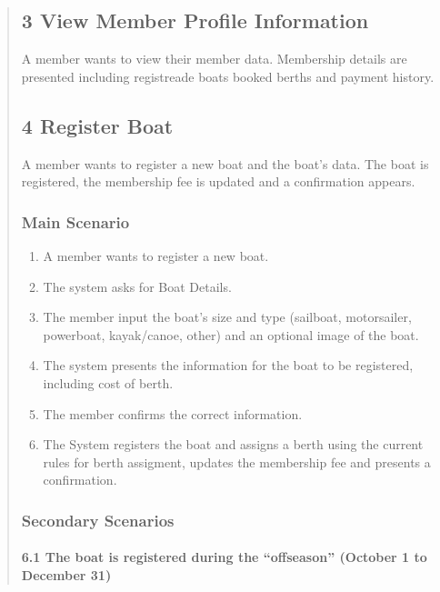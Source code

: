 \begin{quote}
\subsection{3 View Member Profile
Information}\label{view-member-profile-information}

A member wants to view their member data. Membership details are
presented including registreade boats booked berths and payment history.

\subsection{4 Register Boat}\label{register-boat}

A member wants to register a new boat and the boat's data. The boat is
registered, the membership fee is updated and a confirmation appears.

\subsubsection{Main Scenario}\label{main-scenario-2}

\begin{enumerate}
\tightlist
\item
  A member wants to register a new boat.
\item
  The system asks for Boat Details.
\item
  The member input the boat's size and type (sailboat, motorsailer,
  powerboat, kayak/canoe, other) and an optional image of the boat.
\item
  The system presents the information for the boat to be registered,
  including cost of berth.
\item
  The member confirms the correct information.
\item
  The System registers the boat and assigns a berth using the current
  rules for berth assigment, updates the membership fee and presents a
  confirmation.
\end{enumerate}

\subsubsection{Secondary Scenarios}\label{secondary-scenarios-2}

\paragraph{\texorpdfstring{6.1 The boat is registered during the
``offseason'' (October 1 to December
31)}{6.1 The boat is registered during the offseason (October 1 to December 31)}}\label{the-boat-is-registered-during-the-offseason-october-1-to-december-31}


\end{quote}
